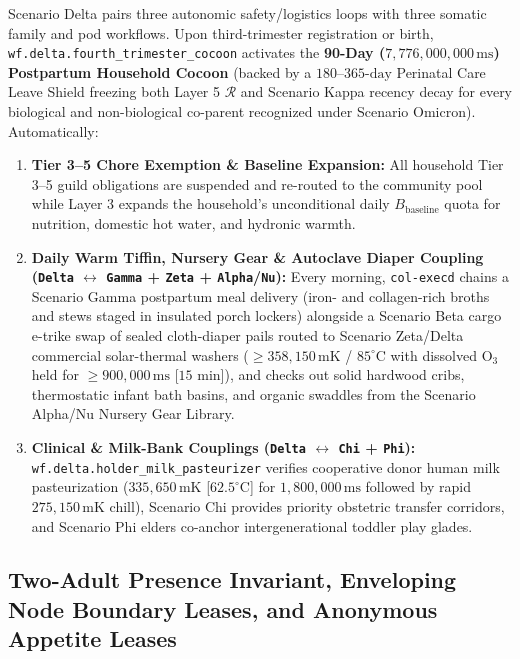 Scenario Delta pairs three autonomic safety/logistics loops with three somatic family and pod
workflows. Upon third-trimester registration or birth, \texttt{wf.delta.fourth\_trimester\_cocoon}
activates the \textbf{90-Day ($7{,}776{,}000{,}000\,\mathrm{ms}$) Postpartum Household Cocoon}
(backed by a $180\text{--}365\text{-day}$ Perinatal Care Leave Shield freezing both Layer 5
$\mathcal{R}$ and Scenario Kappa recency decay for every biological and non-biological
co-parent recognized under Scenario Omicron). Automatically:
\begin{enumerate}
    \item \textbf{Tier 3--5 Chore Exemption \& Baseline Expansion:} All household Tier 3--5
    guild obligations are suspended and re-routed to the community pool while Layer 3 expands
    the household's unconditional daily $B_{\mathrm{baseline}}$ quota for nutrition, domestic
    hot water, and hydronic warmth.
    \item \textbf{Daily Warm Tiffin, Nursery Gear \& Autoclave Diaper Coupling (\texttt{Delta}
    $\leftrightarrow$ \texttt{Gamma} + \texttt{Zeta} + \texttt{Alpha}/\texttt{Nu}):} Every
    morning, \texttt{col-execd} chains a Scenario Gamma postpartum meal delivery (iron- and
    collagen-rich broths and stews staged in insulated porch lockers) alongside a Scenario
    Beta cargo e-trike swap of sealed cloth-diaper pails routed to Scenario Zeta/Delta
    commercial solar-thermal washers ($\ge 358{,}150\,\mathrm{mK}$ / $85^\circ\mathrm{C}$
    with dissolved $\mathrm{O_3}$ held for $\ge 900{,}000\,\mathrm{ms}$ [$15\text{ min}$]),
    and checks out solid hardwood cribs, thermostatic infant bath basins, and organic swaddles
    from the Scenario Alpha/Nu Nursery Gear Library.
    \item \textbf{Clinical \& Milk-Bank Couplings (\texttt{Delta} $\leftrightarrow$
    \texttt{Chi} + \texttt{Phi}):} \texttt{wf.delta.holder\_milk\_pasteurizer} verifies
    cooperative donor human milk pasteurization ($335{,}650\,\mathrm{mK}$ [$62.5^\circ\mathrm{C}$]
    for $1{,}800{,}000\,\mathrm{ms}$ followed by rapid $275{,}150\,\mathrm{mK}$ chill),
    Scenario Chi provides priority obstetric transfer corridors, and Scenario Phi elders
    co-anchor intergenerational toddler play glades.
\end{enumerate}

\subsection{Two-Adult Presence Invariant, Enveloping Node Boundary Leases, and Anonymous Appetite Leases}

